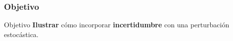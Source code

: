 \begin{frame}
	\frametitle{Objetivo}
	\begin{alertblock}{Objetivo}
		\textbf{Ilustrar} cómo incorporar \textbf{incertidumbre} con una 
		perturbación estocástica.
	\end{alertblock}
\end{frame}
